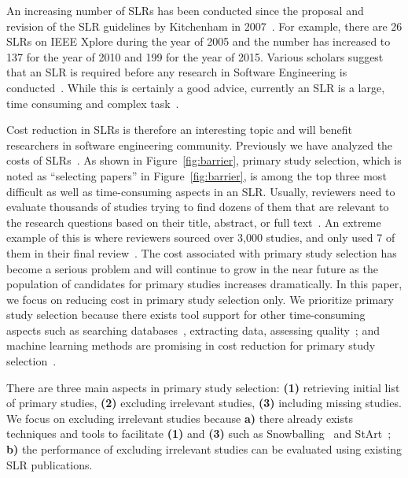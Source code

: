\documentclass[final,twocolumn,5p]{elsarticle}
\theoremstyle{break}
\begin{document}
An increasing number of SLRs has been conducted since the proposal and
revision of the SLR guidelines by Kitchenham in 2007~\cite{keele2007guidelines}. For
example, there are 26 SLRs on IEEE Xplore during the year of 2005 and the
number has increased to 137 for the year of 2010 and 199 for the year of
2015. Various scholars  suggest that an SLR is required before any research in Software
Engineering is conducted~\cite{keele2007guidelines}.
While this is certainly a good advice,
currently an SLR is
a large, time consuming and complex
task~\cite{hassler2016identification,hassler2014outcomes,carver2013identifying,bowes2012slurp}.

Cost reduction in SLRs is therefore an interesting topic and will benefit researchers in software engineering community.
Previously we have analyzed the costs of SLRs~\cite{hassler2014outcomes,carver2013identifying}. As shown in Figure~\ref{fig:barrier}, primary study selection, which is noted as ``selecting papers'' in Figure~\ref{fig:barrier}, is among the top three most difficult
as well as time-consuming aspects in an SLR. Usually, reviewers need to evaluate
thousands of studies trying to find dozens of them that are relevant to the
research questions based on their title, abstract, or full text~\cite{bowes2012slurp}. An extreme
example of this is where reviewers sourced over
3,000 studies, and only used 7 of them in their final review~\cite{bezerra2009systematic}. The cost associated with primary study selection has become a serious problem and will continue to grow in the near future as the population of candidates for primary
studies increases dramatically. In this paper, we focus on reducing cost in primary study selection only. We prioritize primary study selection because there exists tool support for other time-consuming aspects such as searching databases~\cite{Molleri:2015:SWA:2745802.2745825,hernandes2012using}, extracting data\cite{Molleri:2015:SWA:2745802.2745825,hernandes2012using,fernandez2010slr,bowes2012slurp}, assessing quality~\cite{fernandez2010slr,bowes2012slurp,Molleri:2015:SWA:2745802.2745825}; and machine learning methods are promising in cost reduction for primary study selection~\cite{wallace2010semi,grossman2013}.



There are three main aspects in primary study selection: \textbf{(1)} retrieving initial list of primary studies, \textbf{(2)} excluding irrelevant studies, \textbf{(3)} including missing studies. We focus on excluding irrelevant studies because \textbf{a)} there already exists techniques and tools to facilitate \textbf{(1)} and \textbf{(3)} such as Snowballing~\cite{jalali2012systematic} and StArt~\cite{hernandes2012using}; \textbf{b)} the performance of excluding irrelevant studies can be evaluated using existing SLR publications.
\end{document}
